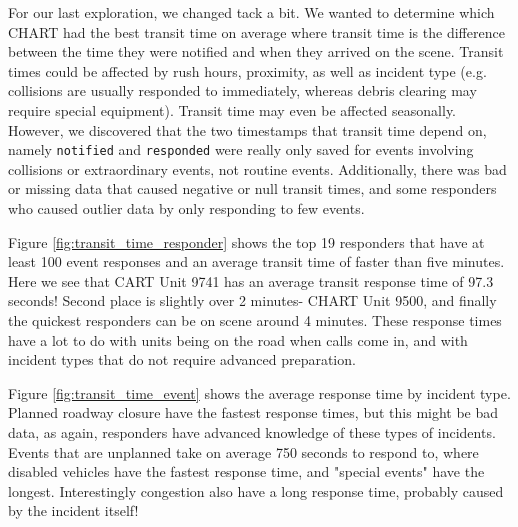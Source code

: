 \documentclass[11pt,letterpaper]{article}
\begin{document}
For our last exploration, we changed tack a bit. We wanted to determine which CHART had the best transit time on average where transit time is the difference between the time they were notified and when they arrived on the scene. Transit times could be affected by rush hours, proximity, as well as incident type (e.g. collisions are usually responded to immediately, whereas debris clearing may require special equipment). Transit time may even be affected seasonally. However, we discovered that the two timestamps that transit time depend on, namely \texttt{notified} and \texttt{responded} were really only saved for events involving collisions or extraordinary events, not routine events. Additionally, there was bad or missing data that caused negative or null transit times, and some responders who caused outlier data by only responding to few events.  

Figure \ref{fig:transit_time_responder} shows the top 19 responders that have at least 100 event responses and an average transit time of faster than five minutes. Here we see that CART Unit 9741 has an average transit response time of 97.3 seconds! Second place is slightly over 2 minutes- CHART Unit 9500, and finally the quickest responders can be on scene around 4 minutes. These response times have a lot to do with units being on the road when calls come in, and with incident types that do not require advanced preparation. 

Figure \ref{fig:transit_time_event} shows the average response time by incident type. Planned roadway closure have the fastest response times, but this might be bad data, as again, responders have advanced knowledge of these types of incidents. Events that are unplanned take on average 750 seconds to respond to, where disabled vehicles have the fastest response time, and "special events" have the longest. Interestingly congestion also have a long response time, probably caused by the incident itself!
\end{document}
